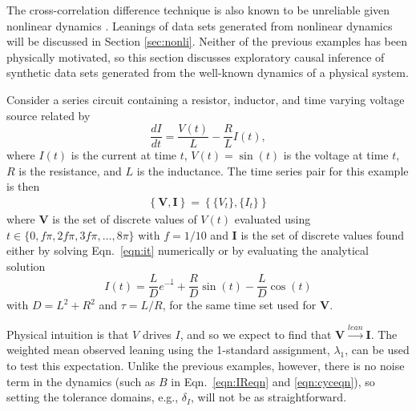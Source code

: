 \documentclass[twocolumn,aps,pre,groupedaddress]{revtex4-1}
\begin{document}
The cross-correlation difference technique is also known to be unreliable given nonlinear dynamics \cite{Rogosa1980}.  Leanings of data sets generated from nonlinear dynamics will be discussed in Section \ref{sec:nonli}.  Neither of the previous examples has been physically motivated, so this section discusses exploratory causal inference of synthetic data sets generated from the well-known dynamics of a physical system.

Consider a series circuit containing a resistor, inductor, and time varying voltage source related by
\begin{equation}
\label{eqn:it}
\frac{dI}{dt} = \frac{V(t)}{L} - \frac{R}{L} I(t),
\end{equation}
where $I(t)$ is the current at time $t$, $V(t)= \sin\left(t\right)$ is the voltage at time $t$, $R$ is the resistance, and $L$ is the inductance.  The time series pair for this example is then 
\begin{eqnarray}
\label{eqn:RLcirceqn}
\left\{\mathbf{V},\mathbf{I}\right\} = \left\{\{V_t\},\{I_t\}\right\}
\end{eqnarray}
where $\mathbf{V}$ is the set of discrete values of $V(t)$ evaluated using $t\in\{0,f\pi,2f\pi,3f\pi,\ldots,8\pi\}$ with $f=1/10$ and $\mathbf{I}$ is the set of discrete values found either by solving Eqn.\ \ref{eqn:it} numerically or by evaluating the analytical solution 
\begin{equation}
I(t) = \frac{L}{D}e^{-\frac{t}{
}}+\frac{R}{D}\sin(t)-\frac{L}{D}\cos(t)
\end{equation}
with $D = L^2 + R^2$ and $\tau = L/R$, for the same time set used for $\mathbf{V}$.

Physical intuition is that $V$ drives $I$, and so we expect to find that $\mathbf{V}\xrightarrow{lean}\mathbf{I}$.  The weighted mean observed leaning using the 1-standard assignment, $\lambda_1$, can be used to test this expectation.  Unlike the previous examples, however, there is no noise term in the dynamics (such as $B$ in Eqn.\ \ref{eqn:IReqn} and \ref{eqn:cyceqn}), so setting the tolerance domains, e.g., $\delta_I$, will not be as straightforward.  
\end{document}

